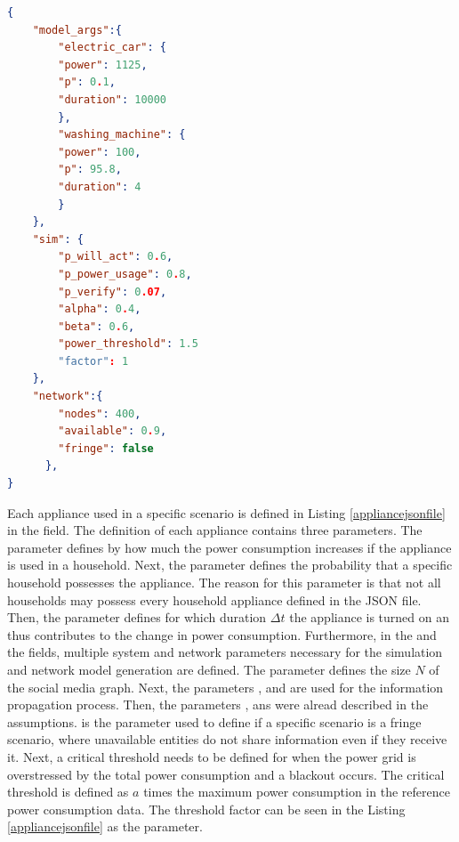 \begin{lstlisting}[language=json,firstnumber=1, 
    caption={Example parameters for household appliances for 
    the simulation},captionpos=b,label={appliancejsonfile}]
{
    "model_args":{
        "electric_car": {
        "power": 1125,
        "p": 0.1,
        "duration": 10000
        },
        "washing_machine": {
        "power": 100,
        "p": 95.8,
        "duration": 4
        }
    },
    "sim": {
        "p_will_act": 0.6,
        "p_power_usage": 0.8,
        "p_verify": 0.07,
        "alpha": 0.4,
        "beta": 0.6,
        "power_threshold": 1.5
        "factor": 1
    },
    "network":{
        "nodes": 400,
        "available": 0.9,
        "fringe": false
      }, 
}
\end{lstlisting}

Each appliance used in a specific scenario 
is defined in Listing \ref{appliancejsonfile} in the 
 field. The definition of each 
appliance contains three parameters. The 
parameter defines by how much the power consumption
increases if the appliance is used in a household.
Next, the  parameter defines the probability that 
a specific household possesses the appliance. The reason for
this parameter is that not all households may possess
every household appliance defined in the JSON file.
Then, the  parameter defines for which duration
$\Delta t$ the appliance is turned on an thus contributes
to the change in power consumption. Furthermore, in 
the  and the  fields, 
multiple system and network parameters
necessary for the simulation and network 
model generation are defined.
The parameter  defines the size $N$ of the social media graph.
Next, the parameters ,  and 
are used for the information propagation process.
Then, the parameters , 
ans 
were alread described in the assumptions. 
 is the parameter used to define if a specific scenario
is a fringe scenario, where unavailable entities do not share 
information even if they receive it.
Next, a critical threshold needs to be defined 
for when the power grid is overstressed by the 
total power consumption and a blackout occurs.
The critical threshold is defined as $a$ times
the maximum power consumption in the reference power
consumption data. The threshold factor can be seen
in the Listing \ref{appliancejsonfile} as the
 parameter.

